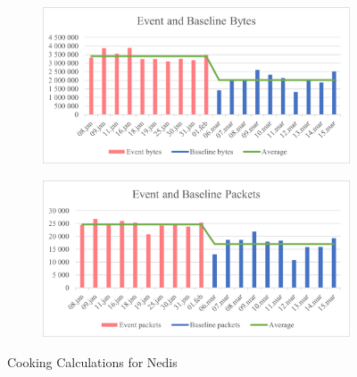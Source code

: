 \begin{figure}[H]
    \centering
    \begin{subfigure}{1\textwidth}
        \centering
        \includegraphics[width=1\hsize]{figures/Nedis_Cooking_Calculations_Bytes.png} 
    \end{subfigure}
    \begin{subfigure}{1\textwidth}
        \centering
        \includegraphics[width=1\hsize]{figures/Nedis_Cooking_Calculations_Packets.png} 
    \end{subfigure}
    \caption{Cooking Calculations for Nedis}
    \label{fig:NedisCookingCalculations}
\end{figure}

